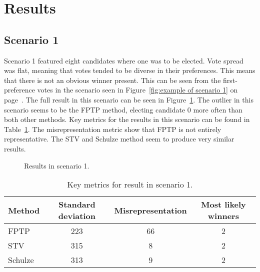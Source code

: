 \documentclass[12pt]{article}
\begin{document}
\section{Results}
\subsection{Scenario 1}
\label{sec:resuls-scenario1}
Scenario 1 featured eight candidates where one was to be elected. Vote spread was flat, meaning that votes tended to be diverse in their preferences. This means that there is not an obvious winner present. This can be seen from the first-preference votes in the scenario seen in Figure~\ref{fig:example of scenario 1} on page~\pageref{fig:example of scenario 1}. The full result in this scenario can be seen in Figure~\ref{fig:scenario 1 results}. The outlier in this scenario seems to be the FPTP method, electing candidate 0 more often than both other methods. Key metrics for the results in this scenario can be found in Table~\ref{tab:scenario 1 result}. The misrepresentation metric show that FPTP is not entirely representative. The STV and Schulze method seem to produce very similar results.
\begin{figure}[H]
	\centering
	\caption{Results in scenario 1.}
\label{fig:scenario 1 results}
\end{figure}

\begin{table}[H]
\centering
\caption{Key metrics for result in scenario 1.}
\label{tab:scenario 1 result}
\begin{tabular}{@{}lccc@{}}
\toprule
Method & Standard deviation & Misrepresentation & Most likely winners \\ \midrule
FPTP & 223 & 66 & 2 \\
STV & 315 & 8 & 2 \\
Schulze & 313 & 9 & 2 \\ \bottomrule
\end{tabular}
\end{table}
\end{document}
